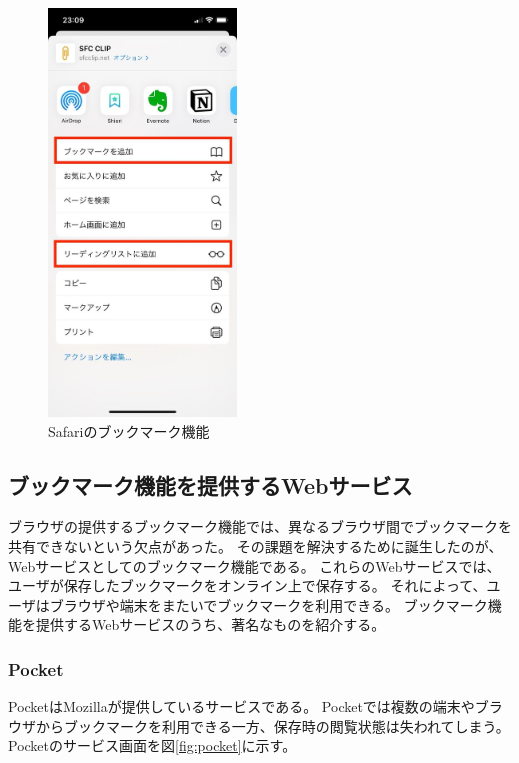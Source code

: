 \begin{figure}[htbp]
  \label{fig:safari-bookmark}
  \begin{center}
    \includegraphics[bb=0 0 585 1266,width=5cm]{img/020_related_works/safari-bookmark.pdf}
  \end{center}
  \caption{Safariのブックマーク機能}
\end{figure}

\subsection{ブックマーク機能を提供するWebサービス}
ブラウザの提供するブックマーク機能では、異なるブラウザ間でブックマークを共有できないという欠点があった。
その課題を解決するために誕生したのが、Webサービスとしてのブックマーク機能である。
これらのWebサービスでは、ユーザが保存したブックマークをオンライン上で保存する。
それによって、ユーザはブラウザや端末をまたいでブックマークを利用できる。
ブックマーク機能を提供するWebサービスのうち、著名なものを紹介する。

\subsubsection{Pocket}
PocketはMozilla\cite{mozilla}が提供しているサービスである。
Pocketでは複数の端末やブラウザからブックマークを利用できる一方、保存時の閲覧状態は失われてしまう。
Pocketのサービス画面を図\ref{fig:pocket}に示す。

